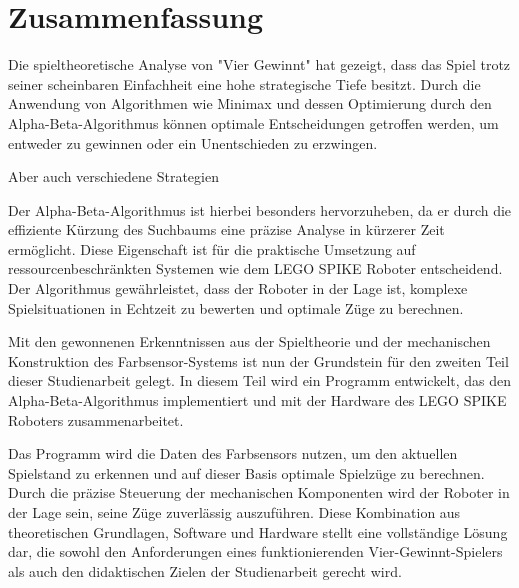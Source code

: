 \chapter{Zusammenfassung}


Die spieltheoretische Analyse von "Vier Gewinnt" hat gezeigt, dass das Spiel trotz seiner scheinbaren Einfachheit eine hohe strategische Tiefe besitzt. Durch die Anwendung von Algorithmen wie Minimax und dessen Optimierung durch den Alpha-Beta-Algorithmus können optimale Entscheidungen getroffen werden, um entweder zu gewinnen oder ein Unentschieden zu erzwingen. 

Aber auch verschiedene Strategien 

Der Alpha-Beta-Algorithmus ist hierbei besonders hervorzuheben, da er durch die effiziente Kürzung des Suchbaums eine präzise Analyse in kürzerer Zeit ermöglicht. Diese Eigenschaft ist für die praktische Umsetzung auf ressourcenbeschränkten Systemen wie dem LEGO SPIKE Roboter entscheidend. Der Algorithmus gewährleistet, dass der Roboter in der Lage ist, komplexe Spielsituationen in Echtzeit zu bewerten und optimale Züge zu berechnen.

Mit den gewonnenen Erkenntnissen aus der Spieltheorie und der mechanischen Konstruktion des Farbsensor-Systems ist nun der Grundstein für den zweiten Teil dieser Studienarbeit gelegt. In diesem Teil wird ein Programm entwickelt, das den Alpha-Beta-Algorithmus implementiert und mit der Hardware des LEGO SPIKE Roboters zusammenarbeitet. 

Das Programm wird die Daten des Farbsensors nutzen, um den aktuellen Spielstand zu erkennen und auf dieser Basis optimale Spielzüge zu berechnen. Durch die präzise Steuerung der mechanischen Komponenten wird der Roboter in der Lage sein, seine Züge zuverlässig auszuführen. Diese Kombination aus theoretischen Grundlagen, Software und Hardware stellt eine vollständige Lösung dar, die sowohl den Anforderungen eines funktionierenden Vier-Gewinnt-Spielers als auch den didaktischen Zielen der Studienarbeit gerecht wird.
